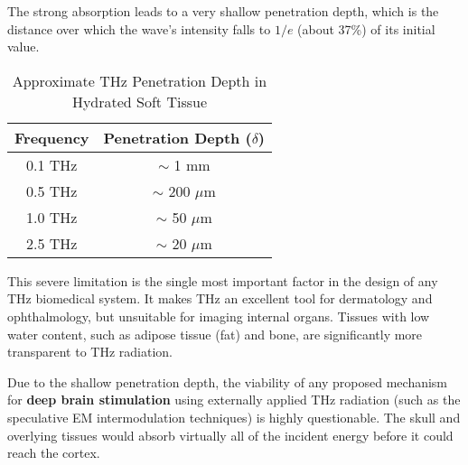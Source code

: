 The strong absorption leads to a very shallow penetration depth, which is the distance over which the wave's intensity falls to $1/e$ (about 37\%) of its initial value.

\begin{table}[H]
    \centering
    \caption{Approximate THz Penetration Depth in Hydrated Soft Tissue}
    \label{tab:thz-penetration}
    \begin{tabular}{@{}cc@{}}
        \toprule
        \tableheaderfont Frequency & \tableheaderfont Penetration Depth ($\delta$) \\
        \midrule
        0.1 THz & $\sim$ 1 mm \\
        0.5 THz & $\sim$ 200 $\mu$m \\
        1.0 THz & $\sim$ 50 $\mu$m \\
        2.5 THz & $\sim$ 20 $\mu$m \\
        \bottomrule
    \end{tabular}
\end{table}

This severe limitation is the single most important factor in the design of any THz biomedical system. It makes THz an excellent tool for dermatology and ophthalmology, but unsuitable for imaging internal organs. Tissues with low water content, such as adipose tissue (fat) and bone, are significantly more transparent to THz radiation.

\begin{warningbox}
    Due to the shallow penetration depth, the viability of any proposed mechanism for \textbf{deep brain stimulation} using externally applied THz radiation (such as the speculative EM intermodulation techniques) is highly questionable. The skull and overlying tissues would absorb virtually all of the incident energy before it could reach the cortex.
\end{warningbox}


